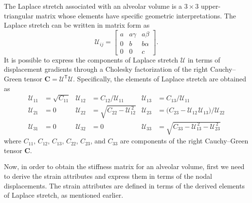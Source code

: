 The Laplace stretch associated with an alveolar volume is a $3\times3$ upper-triangular matrix whose elements have specific geometric interpretations. The Laplace stretch can be written in matrix form as \cite{FreedSrinivasa15}
\begin{equation}
    \label{LagrangianPhysicalStretch}
    \mathcal{U}_{ij} = \begin{bmatrix}
    a & a \gamma & a \beta \\
    0 & b & b \alpha \\
    0 & 0 & c \end{bmatrix} .
\end{equation}
It is possible to express the components of Laplace stretch $\boldsymbol{\mathcal{U}}$ in terms of displacement gradients through a Cholesky factorization of the right Cauchy--Green tensor $\mathbf{C} = \boldsymbol{\mathcal{U}}^{\mathsf{T}} \boldsymbol{\mathcal{U}}$. Specifically, the elements of Laplace stretch are obtained as \cite{Srinivasa12}
\begin{equation}
\begin{aligned}
\mathcal{U}_{11} & = \sqrt{C_{11}} & 
\mathcal{U}_{12} & = C_{12} / \mathcal{U}_{11} &
\mathcal{U}_{13} & = C_{13} / \mathcal{U}_{11} \\
\mathcal{U}_{21} & = 0 &
\mathcal{U}_{22} & = \sqrt{C_{22} - \mathcal{U}_{12}^{\,2}} &
\mathcal{U}_{23} & = \bigl( C_{23} - \mathcal{U}_{12\,}\mathcal{U}_{13} \bigr) / \mathcal{U}_{22} \\
\mathcal{U}_{31} & = 0 &
\mathcal{U}_{32} & = 0 & 
\mathcal{U}_{33} & = \sqrt{C_{33} - \mathcal{U}_{13}^{\,2} - \mathcal{U}_{23}^{\,2}}
\end{aligned}
\label{LagrangianLaplaceStretch}
\end{equation}
where ${C_{11}}$, ${C_{12}}$, ${C_{13}}$, $C_{22}$, $C_{23}$, and ${C_{33}}$ are components of the right Cauchy--Green tensor $\mathbf{C}$.

Now, in order to obtain the stiffness matrix for an alveolar volume, first we need to derive the strain attributes and express them in terms of the nodal displacements. The strain attributes are defined in terms of the derived elements of Laplace stretch, as mentioned earlier.

